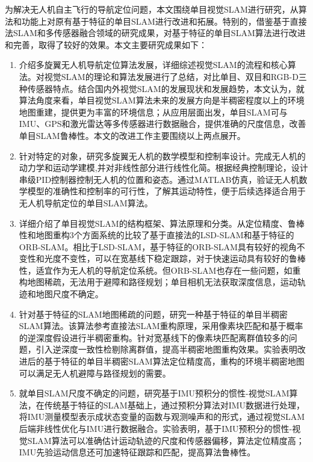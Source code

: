 


\begin{conclusion}
为解决无人机自主飞行的导航定位问题，本文围绕单目视觉SLAM进行研究，从算法和功能上对原有基于特征的单目SLAM进行改进和拓展。特别的，借鉴基于直接法SLAM和多传感器融合领域的研究成果，对基于特征的单目SLAM算法进行改进和完善，取得了较好的效果。本文主要研究成果如下：
\begin{enumerate}  [label={(\arabic*)}]
\item 介绍多旋翼无人机导航定位算法发展，详细综述视觉SLAM的流程和核心算法。对视觉SLAM的理论和算法发展进行了总结，对比单目、双目和RGB-D三种传感器特点。结合国内外视觉SLAM的发展现状和发展趋势，本文认为，就算法角度来看，单目视觉SLAM算法未来的发展方向是半稠密程度以上的环境地图重建，提供更为丰富的环境信息；从应用层面出发，单目SLAM可与IMU、GPS和激光雷达等多传感器进行数据融合，提供准确的尺度信息，改善单目SLAM鲁棒性。本文的改进工作主要围绕以上两点展开。
\item 针对特定的对象，研究多旋翼无人机的数学模型和控制率设计。完成无人机的动力学和运动学建模,并对非线性部分进行线性化简。根据经典控制理论，设计串级PID控制器控制无人机的位置和姿态。通过MATLAB仿真，验证无人机数学模型的准确性和控制率的可行性，了解其运动特性，便于后续选择适合用于无人机导航定位的单目SLAM算法。
\item 详细介绍了单目视觉SLAM的结构框架、算法原理和分类。从定位精度、鲁棒性和地图重构3个方面系统的比较了基于直接法的LSD-SLAM和基于特征的ORB-SLAM。相比于LSD-SLAM，基于特征的ORB-SLAM具有较好的视角不变性和光度不变性，可以在宽基线下稳定跟踪，对于快速运动具有较好的鲁棒性，适宜作为无人机的导航定位系统。但ORB-SLAM也存在一些问题，如重构地图稀疏，无法用于避障和路径规划；单目相机无法获取深度信息，运动轨迹和地图尺度不确定。
\item 针对基于特征的SLAM地图稀疏的问题，研究一种基于特征的单目半稠密SLAM算法。该算法参考直接法SLAM重构原理，采用像素块匹配和基于概率的逆深度假设进行半稠密重构。针对宽基线下的像素块匹配离群值较多的问题，引入逆深度一致性检剔除离群值，提高半稠密地图重构效果。实验表明改进后的基于特征的单目半稠密SLAM算法定位精度高，重构的环境半稠密地图可以满足无人机避障与路径规划的需要。
\item 就单目SLAM尺度不确定的问题，研究基于IMU预积分的惯性-视觉SLAM算法，在传统基于特征的SLAM基础上，通过预积分算法对IMU数据进行处理，将IMU测量模型表示成状态变量的函数与观测噪声和的形式，通过视觉SLAM后端非线性优化与IMU进行数据融合。实验表明，基于IMU预积分的惯性-视觉SLAM算法可以准确估计运动轨迹的尺度和传感器偏移，算法定位精度高；IMU先验运动信息还可加速特征跟踪和匹配，提高算法鲁棒性。
\end{enumerate}


\end{conclusion}

